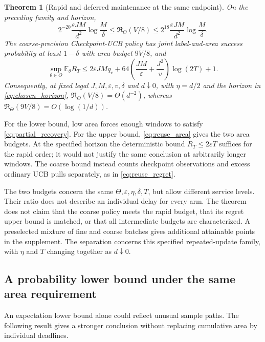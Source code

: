 \documentclass[11pt]{article}
\newtheorem{theorem}{Theorem}[section]
\theoremstyle{remark}
\newcommand{\E}{\mathbb E}
\begin{document}
\begin{theorem}[Rapid and deferred maintenance at the same endpoint]
\label{thm:tradeoff}
On the preceding family and horizon,
\begin{equation}
 2^{-20}\frac{\varepsilon JM}{d^2}\log\frac M\delta
 \le\mathfrak R_\Theta(V/8)\le
 2^{18}\frac{\varepsilon JM}{d^2}\log\frac M\delta.
 \label{eq:rapid_matched}
\end{equation}
The coarse-precision Checkpoint-UCB policy has joint label-and-area success
probability at least $1-\delta$ with area budget $9V/8$, and
\begin{equation}
 \sup_{\theta\in\Theta}\E_\theta R_T\le
 2\varepsilon JM q_c+
 64\left(\frac{JM}{\varepsilon}+\frac{J^2}{v}\right)\log(2T)+1.
 \label{eq:coarse_regret}
\end{equation}
Consequently, at fixed legal $J,M,\varepsilon,v,\delta$ and $d\downarrow0$,
with $\eta=d/2$ and the horizon in \eqref{eq:chosen_horizon},
$\mathfrak R_\Theta(V/8)=\Theta(d^{-2})$, whereas
$\mathfrak R_\Theta(9V/8)=O(\log(1/d))$.
\end{theorem}

For the lower bound, low area forces enough windows to satisfy
\eqref{eq:partial_recovery}. For the upper bound, \eqref{eq:reuse_area}
gives the two area budgets. At the specified horizon the deterministic bound
$R_T\le2\varepsilon T$ suffices for the rapid order; it would not justify
the same conclusion at arbitrarily longer windows. The coarse bound instead
counts checkpoint observations and excess ordinary UCB pulls separately,
as in \eqref{eq:reuse_regret}.

The two budgets concern the same $\Theta,\varepsilon,\eta,\delta,T$, but
allow different service levels. Their ratio does not describe an individual
delay for every arm. The theorem does not claim that the coarse policy meets
the rapid budget, that its regret upper bound is matched, or that all
intermediate budgets are characterized. A preselected mixture of fine and
coarse batches gives additional attainable points in the supplement. The
separation concerns this specified repeated-update family, with $\eta$ and
$T$ changing together as $d\downarrow0$.

\subsection{A probability lower bound under the same area requirement}

An expectation lower bound alone could reflect unusual sample paths. The
following result gives a stronger conclusion without replacing cumulative
area by individual deadlines.
\end{document}

